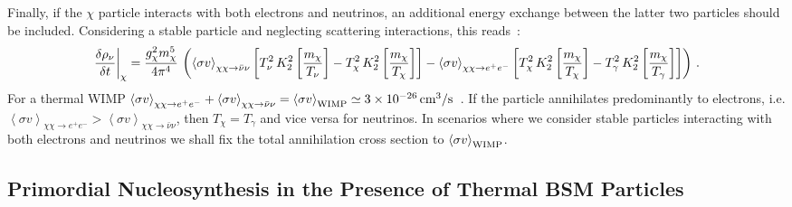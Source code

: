 \documentclass[notitlepage,letterpaper,natbib,aps,prd,onecolumn,amsmath,amsfonts,nofootinbib,preprintnumbers,superscriptaddress,secnumarabic,groupedaddress]{revtex4-1}
\begin{document}
Finally, if the $\chi$ particle interacts with both electrons and neutrinos, an additional energy exchange between the latter two particles should be included. Considering a stable particle and neglecting scattering interactions, this reads~\cite{Escudero:2018mvt}:
\begin{align}\label{eq:energyrates_WIMP}
 \left. \frac{\delta \rho_{\nu}}{\delta t}  \right|_{\chi} =  \frac{g_\chi^2 m_{\rm \chi}^5}{4\pi^4} \,\left( \left< \sigma v \right>_{\chi \chi \to \bar{\nu}\nu} \left[T_\nu^2  \, K_2^2\left[\frac{m_{\chi}}{T_{\nu}} \right] -  T_\chi^2 \, K_2^2\left[\frac{m_{\chi}}{T_{\chi}} \right] \right] - \left< \sigma v \right>_{\chi \chi \to e^+ e^-} \left[T_\chi^2  \, K_2^2\left[\frac{m_{\chi}}{T_{\chi}} \right] -  T_\gamma^2 \, K_2^2\left[\frac{m_{\chi}}{T_{\gamma}} \right] \right] \right)  \,.
\end{align}
For a thermal WIMP $\left< \sigma v \right>_{\chi \chi \to e^+ e^-} + \left< \sigma v \right>_{\chi \chi \to \bar{\nu} \nu} = \left< \sigma v \right>_{\rm WIMP} \simeq 3 \times 10^{-26}\,\text{cm}^3/\text{s} $~\cite{Steigman:2012nb}. If the particle annihilates predominantly to electrons, i.e. $\left< \sigma v \right>_{\chi \chi \to e^+ e^-} > \left< \sigma v \right>_{\chi \chi \to \bar{\nu} \nu}$, then $T_\chi = T_\gamma $ and vice versa for neutrinos. In scenarios where we consider stable particles interacting with both electrons and neutrinos we shall fix the total annihilation cross section to $\left< \sigma v \right>_{\rm WIMP}$. 


\subsection{Primordial Nucleosynthesis in the Presence of Thermal BSM Particles}\label{sec:earlyUniverse_method}
\end{document}
